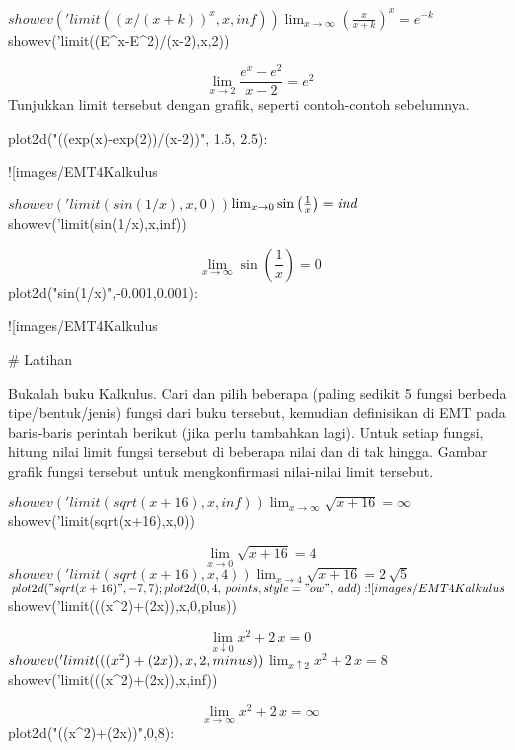 \documentclass{article}
\begin{document}
\>$showev('limit((x/(x+k))^x,x,inf))


$$\lim_{x\rightarrow \infty }{\left(\frac{x}{x+k}\right)^{x}}=e^ {- k
  }$$\>$showev('limit((E^x-E^2)/(x-2),x,2))


$$\lim_{x\rightarrow 2}{\frac{e^{x}-e^2}{x-2}}=e^2$$Tunjukkan limit tersebut dengan grafik, seperti contoh-contoh sebelumnya.


\>plot2d("((exp(x)-exp(2))/(x-2))", 1.5, 2.5):


![images/EMT4Kalkulus%

\>$showev('limit(sin(1/x),x,0))


$$\lim_{x\rightarrow 0}{\sin \left(\frac{1}{x}\right)}={\it ind}$$\>$showev('limit(sin(1/x),x,inf))


$$\lim_{x\rightarrow \infty }{\sin \left(\frac{1}{x}\right)}=0$$\>plot2d("sin(1/x)",-0.001,0.001):


![images/EMT4Kalkulus%

# Latihan

Bukalah buku Kalkulus. Cari dan pilih beberapa (paling sedikit 5 fungsi berbeda
tipe/bentuk/jenis) fungsi dari buku tersebut, kemudian definisikan di EMT pada
baris-baris perintah berikut (jika perlu tambahkan lagi). Untuk setiap fungsi, hitung
nilai limit fungsi tersebut di beberapa nilai dan di tak hingga. Gambar grafik fungsi
tersebut untuk mengkonfirmasi nilai-nilai limit tersebut.


\>$showev('limit(sqrt(x+16),x,inf))


$$\lim_{x\rightarrow \infty }{\sqrt{x+16}}=\infty $$\>$showev('limit(sqrt(x+16),x,0))


$$\lim_{x\rightarrow 0}{\sqrt{x+16}}=4$$\>$showev('limit(sqrt(x+16),x,4))


$$\lim_{x\rightarrow 4}{\sqrt{x+16}}=2\,\sqrt{5}$$\>plot2d("sqrt(x+16)",-7,7); plot2d(0,4,\>points,style="ow",\>add):


![images/EMT4Kalkulus%

\> 

\>$showev('limit(((x^2)+(2\*x)),x,0,plus))


$$\lim_{x\downarrow 0}{x^2+2\,x}=0$$\>$showev('limit(((x^2)+(2\*x)),x,2,minus))


$$\lim_{x\uparrow 2}{x^2+2\,x}=8$$\>$showev('limit(((x^2)+(2\*x)),x,inf))


$$\lim_{x\rightarrow \infty }{x^2+2\,x}=\infty $$\>plot2d("((x^2)+(2\*x))",0,8):
\end{document}

